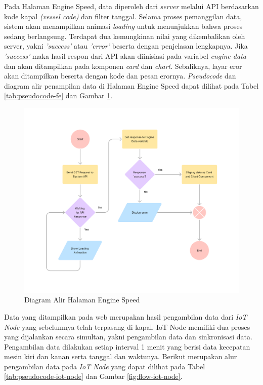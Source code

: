 Pada Halaman Engine Speed, data diperoleh dari \textit{server} melalui API berdasarkan kode kapal \textit{(vessel code)} dan filter tanggal. Selama proses pemanggilan data, sistem akan menampilkan animasi \textit{loading} untuk menunjukkan bahwa proses sedang berlangsung. Terdapat dua kemungkinan nilai yang dikembalikan oleh server, yakni \textit{'success'} atau \textit{'error'} beserta dengan penjelasan lengkapnya. Jika \textit{'success'} maka hasil respon dari API akan diinisiasi pada variabel \textit{engine data} dan akan ditampilkan pada komponen \textit{card} dan \textit{chart}. Sebaliknya, layar eror akan ditampilkan beserta dengan kode dan pesan erornya. \textit{Pseudocode} dan diagram alir penampilan data di Halaman Engine Speed dapat dilihat pada Tabel \ref{tab:pseudocode-fe} dan Gambar \ref{fig:flow-fe}.



\begin{figure}[!h]
    \includegraphics[width=1.2\linewidth, center]{images/flowcharts/flow-fe.png}
    \caption{Diagram Alir Halaman Engine Speed}
    \label{fig:flow-fe}
\end{figure}

\newpage

Data yang ditampilkan pada web merupakan hasil pengambilan data dari \textit{IoT Node} yang sebelumnya telah terpasang di kapal. IoT Node memiliki dua proses yang dijalankan secara simultan, yakni pengambilan data dan sinkronisasi data. Pengambilan data dilakukan setiap interval 1 menit yang berisi data kecepatan mesin kiri dan kanan serta tanggal dan waktunya. Berikut merupakan alur pengambilan data pada \textit{IoT Node} yang dapat dilihat pada Tabel \ref{tab:pseudocode-iot-node} dan Gambar \ref{fig:flow-iot-node}.

